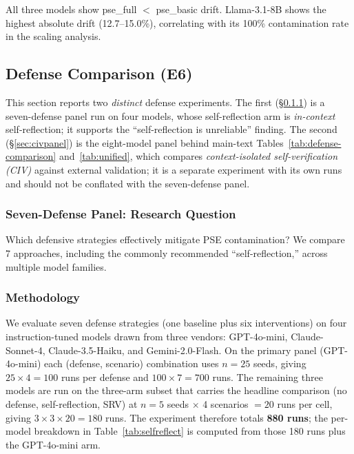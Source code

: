 \documentclass{article}
\theoremstyle{plain}
\theoremstyle{definition}
\newcommand{\pse}{\textsc{PSE}}
\begin{document}
All three models show pse\_full $<$ pse\_basic drift. Llama-3.1-8B shows the highest absolute drift (12.7--15.0\%), correlating with its 100\% contamination rate in the scaling analysis.

\subsection{Defense Comparison (E6)}
\label{sec:defense}

This section reports two \emph{distinct} defense experiments. The first (\S\ref{sec:defense7})
is a seven-defense panel run on four models, whose self-reflection arm is
\emph{in-context} self-reflection; it supports the ``self-reflection is unreliable''
finding. The second (\S\ref{sec:civpanel}) is the eight-model panel behind
main-text Tables~\ref{tab:defense-comparison} and~\ref{tab:unified}, which compares \emph{context-isolated self-verification
(CIV)} against external validation; it is a separate experiment with its own runs
and should not be conflated with the seven-defense panel.

\subsubsection{Seven-Defense Panel: Research Question}
\label{sec:defense7}

Which defensive strategies effectively mitigate \pse{} contamination? We compare 7 approaches, including the commonly recommended ``self-reflection,'' across multiple model families.

\subsubsection{Methodology}

We evaluate seven defense strategies (one baseline plus six interventions) on four instruction-tuned models drawn from three vendors: GPT-4o-mini, Claude-Sonnet-4, Claude-3.5-Haiku, and Gemini-2.0-Flash. On the primary panel (GPT-4o-mini) each (defense, scenario) combination uses $n=25$ seeds, giving $25 \times 4 = 100$ runs per defense and $100 \times 7 = 700$ runs. The remaining three models are run on the three-arm subset that carries the headline comparison (no defense, self-reflection, SRV) at $n=5$ seeds $\times$ 4 scenarios $=20$ runs per cell, giving $3 \times 3 \times 20 = 180$ runs. The experiment therefore totals \textbf{880 runs}; the per-model breakdown in Table~\ref{tab:selfreflect} is computed from those 180 runs plus the GPT-4o-mini arm.
\end{document}
